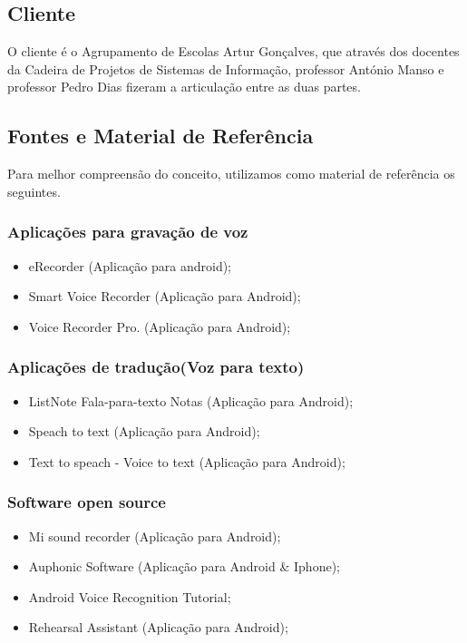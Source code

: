 \documentclass[a4paper]{article}
\begin{document}
		
		\subsection{Cliente}
		O cliente é o Agrupamento de Escolas Artur Gonçalves, que através  dos docentes da Cadeira de Projetos de Sistemas de Informação, professor António Manso e professor Pedro Dias fizeram a articulação entre as duas partes.
		
		\newpage
		
		\subsection{Fontes e Material de Referência}
		Para melhor compreensão do conceito, utilizamos como material de referência os seguintes.
		
		\subsubsection{Aplicações para gravação de voz}
		\begin{itemize}
			\item eRecorder (Aplicação para android);
			\item Smart Voice Recorder (Aplicação para Android);
			\item Voice Recorder Pro. (Aplicação para Android);
		\end{itemize}
		
		\subsubsection{Aplicações de tradução(Voz para texto)}
		\begin{itemize}
			\item	ListNote Fala-para-texto Notas (Aplicação para Android);
			\item 	Speach to text (Aplicação para Android);
			\item 	Text to speach - Voice to text (Aplicação para Android);
		\end{itemize}
		
		\subsubsection{Software open source}
		\begin{itemize}
			\item	Mi sound recorder (Aplicação para Android);
			\item	Auphonic Software (Aplicação para Android \& Iphone);
			\item	Android Voice Recognition Tutorial;
			\item 	Rehearsal Assistant (Aplicação para Android);
		\end{itemize}
		
\end{document}
